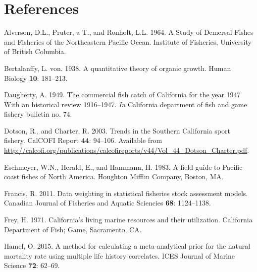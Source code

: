 \documentclass[12pt,]{article}
\begin{document}
\FloatBarrier

\FloatBarrier

\FloatBarrier

\FloatBarrier

\FloatBarrier

\FloatBarrier

\newpage

\color{black}

\section*{References}\label{references}

\renewcommand{\thepage}{}

\hypertarget{refs}{}
\hypertarget{ref-Alverson1964}{}
Alverson, D.L., Pruter, a T., and Ronholt, L.L. 1964. A Study of
Demersal Fishes and Fisheries of the Northeastern Pacific Ocean.
Institute of Fisheries, University of British Columbia.

\hypertarget{ref-vonB1938}{}
Bertalanffy, L. von. 1938. A quantitative theory of organic growth.
Human Biology \textbf{10}: 181--213.

\hypertarget{ref-Daugherty1949}{}
Daugherty, A. 1949. The commercial fish catch of California for the year
1947 With an historical review 1916--1947. \emph{In} California
department of fish and game fishery bulletin no. 74.

\hypertarget{ref-Dotson2003}{}
Dotson, R., and Charter, R. 2003. Trends in the Southern California
sport fishery. CalCOFI Report \textbf{44}: 94--106. Available from
\url{http://calcofi.org/publications/calcofireports/v44/Vol_44_Dotson_Charter.pdf}.

\hypertarget{ref-Eschmeyer1983}{}
Eschmeyer, W.N., Herald, E., and Hammann, H. 1983. A field guide to
Pacific coast fishes of North America. Houghton Mifflin Company, Boston,
MA.

\hypertarget{ref-Francis2011}{}
Francis, R. 2011. Data weighting in statistical fisheries stock
assessment models. Canadian Journal of Fisheries and Aquatic Sciencies
\textbf{68}: 1124--1138.

\hypertarget{ref-Frey1971}{}
Frey, H. 1971. California's living marine resources and their
utilization. California Department of Fish; Game, Sacramento, CA.

\hypertarget{ref-Hamel2015}{}
Hamel, O. 2015. A method for calculating a meta-analytical prior for the
natural mortality rate using multiple life history correlates. ICES
Journal of Marine Science \textbf{72}: 62--69.
\end{document}

